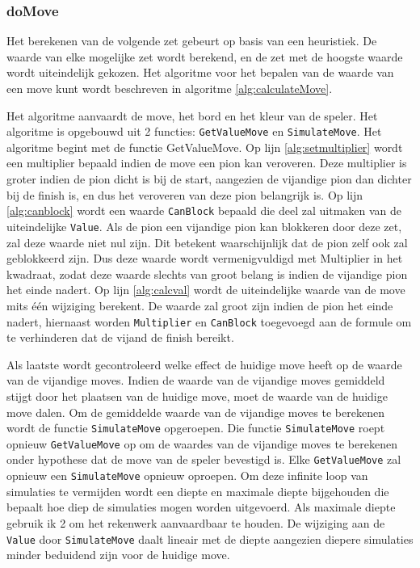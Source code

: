 \documentclass{article}
\begin{document}
\subsubsection{doMove}
Het berekenen van de volgende zet gebeurt op basis van een heuristiek. De waarde van elke mogelijke zet wordt berekend, en de zet met de hoogste waarde wordt uiteindelijk gekozen. 
Het algoritme voor het bepalen van de waarde van een move kunt wordt beschreven in algoritme \ref{alg:calculateMove}. 

Het algoritme aanvaardt de move, het bord en het kleur van de speler.
Het algoritme is opgebouwd uit 2 functies: \texttt{GetValueMove} en \texttt{SimulateMove}. Het algoritme begint met de functie GetValueMove. Op lijn \ref{alg:setmultiplier} wordt een multiplier bepaald indien de move een pion kan veroveren. Deze multiplier is groter indien de pion dicht is bij de start, aangezien de vijandige pion dan dichter bij de finish is, en dus het veroveren van deze pion belangrijk is. Op lijn \ref{alg:canblock} wordt een waarde \texttt{CanBlock} bepaald die deel zal uitmaken van de uiteindelijke \texttt{Value}. Als de pion een vijandige pion kan blokkeren door deze zet, zal deze waarde niet nul zijn. Dit betekent waarschijnlijk dat de pion zelf ook zal geblokkeerd zijn. Dus deze waarde wordt vermenigvuldigd met Multiplier in het kwadraat, zodat deze waarde slechts van groot belang is indien de vijandige pion het einde nadert. Op lijn \ref{alg:calcval} wordt de uiteindelijke waarde van de move mits één wijziging berekent. De waarde zal groot zijn indien de pion het einde nadert, hiernaast worden \texttt{Multiplier} en \texttt{CanBlock} toegevoegd aan de formule om te verhinderen dat de vijand de finish bereikt. 

Als laatste wordt gecontroleerd welke effect de huidige move heeft op de waarde van de vijandige moves. Indien de waarde van de vijandige moves gemiddeld stijgt door het plaatsen van de huidige move, moet de waarde van de huidige move dalen. Om de gemiddelde waarde van de vijandige moves te berekenen wordt de functie \texttt{SimulateMove} opgeroepen. Die functie \texttt{SimulateMove} roept opnieuw \texttt{GetValueMove} op om de waardes van de vijandige moves te berekenen onder hypothese dat de move van de speler bevestigd is. Elke \texttt{GetValueMove} zal opnieuw een \texttt{SimulateMove} opnieuw oproepen. Om deze infinite loop van simulaties te vermijden wordt een diepte en maximale diepte bijgehouden die bepaalt hoe diep de simulaties mogen worden uitgevoerd. Als maximale diepte gebruik ik 2 om het rekenwerk aanvaardbaar te houden. 
De wijziging aan de \texttt{Value} door \texttt{SimulateMove} daalt lineair met de diepte aangezien diepere simulaties minder beduidend zijn voor de huidige move. 
\end{document}
